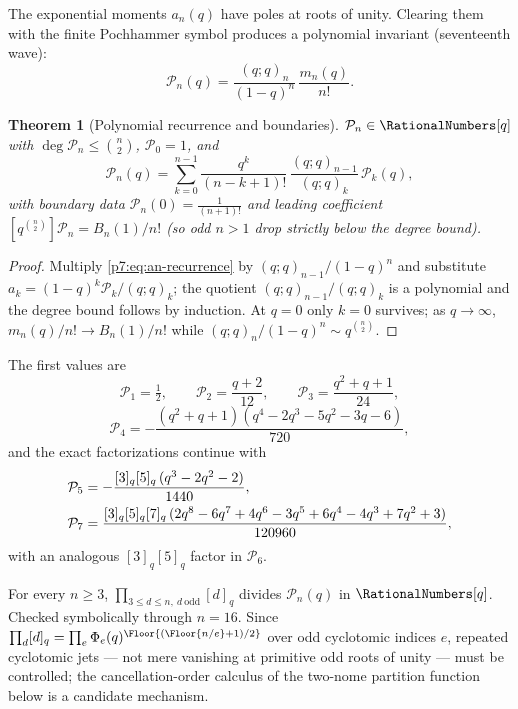 \documentclass[11pt,oneside]{article}
\numberwithin{equation}{section}
\newtheorem{theorem}{Theorem}[section]
\theoremstyle{definition}
\theoremstyle{remark}
\begin{document}
The exponential moments $a_n(q)$ have poles at roots of unity.  Clearing them
with the finite Pochhammer symbol produces a polynomial invariant
(seventeenth wave):
\begin{equation}\label{p7:eq:Pn-def}
 \boxed{\ \mathcal P_n(q)=\frac{(q;q)_n}{(1-q)^n}\,\frac{m_n(q)}{n!}.\ }
\end{equation}

\begin{theorem}[Polynomial recurrence and boundaries]
\label{p7:thm:Pn}
$\mathcal P_n\in\RationalNumbers[q]$ with $\deg\mathcal P_n\le\binom n2$,
$\mathcal P_0=1$, and
\begin{equation}\label{p7:eq:Pn-recurrence}
 \mathcal P_n(q)=
 \sum_{k=0}^{n-1}\frac{q^k}{(n-k+1)!}\,
 \frac{(q;q)_{n-1}}{(q;q)_k}\,\mathcal P_k(q),
\end{equation}
with boundary data
$\mathcal P_n(0)=\tfrac1{(n+1)!}$ and leading coefficient
$[q^{\binom n2}]\mathcal P_n=B_n(1)/n!$ (so odd $n>1$ drop strictly below the
degree bound).
\end{theorem}

\begin{proof}
Multiply \eqref{p7:eq:an-recurrence} by $(q;q)_{n-1}/(1-q)^n$ and substitute
$a_k=(1-q)^k\mathcal P_k/(q;q)_k$; the quotient
$(q;q)_{n-1}/(q;q)_k$ is a polynomial and the degree bound follows by
induction.  At $q=0$ only $k=0$ survives; as $q\to\infty$,
$m_n(q)/n!\to B_n(1)/n!$ while $(q;q)_n/(1-q)^n\sim q^{\binom n2}$.
\end{proof}

The first values are
\[
 \mathcal P_1=\tfrac12,\qquad
 \mathcal P_2=\frac{q+2}{12},\qquad
 \mathcal P_3=\frac{q^2+q+1}{24},
\]
\[
 \mathcal P_4=-\frac{(q^2+q+1)(q^4-2q^3-5q^2-3q-6)}{720},
\]
and the exact factorizations continue with
\begin{align}
 \mathcal P_5&=-\frac{[3]_q[5]_q\,(q^3-2q^2-2)}{1440},
 \notag\\
 \mathcal P_7&=\frac{[3]_q[5]_q[7]_q\,
 (2q^8-6q^7+4q^6-3q^5+6q^4-4q^3+7q^2+3)}{120960},
 \label{p7:eq:Pn-factorizations}
\end{align}
with an analogous $[3]_q[5]_q$ factor in $\mathcal P_6$.

\begin{conjecture}
\label{p7:conj:Pn-divisibility}
For every $n\ge3$,
$\prod_{3\le d\le n,\ d\ \mathrm{odd}}[d]_q$ divides $\mathcal P_n(q)$ in
$\RationalNumbers[q]$.  Checked symbolically through $n=16$.  Since
$\prod_{d}[d]_q=\prod_e\Phi_e(q)^{\Floor{(\Floor{n/e}+1)/2}}$ over odd
cyclotomic indices $e$, repeated cyclotomic jets --- not mere vanishing at
primitive odd roots of unity --- must be controlled; the cancellation-order
calculus of the two-nome partition function below is a candidate mechanism.
\end{conjecture}
\end{document}

